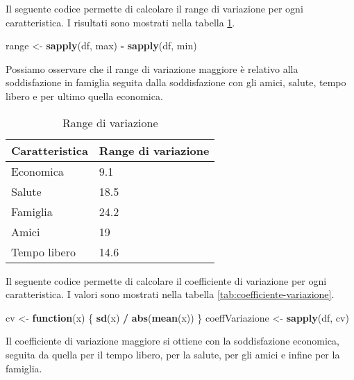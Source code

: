 \documentclass[]{book}
\newenvironment{Shaded}{\begin{snugshade}}{\end{snugshade}}
\newcommand{\KeywordTok}[1]{\textcolor[rgb]{0.13,0.29,0.53}{\textbf{#1}}}
\newcommand{\StringTok}[1]{\textcolor[rgb]{0.31,0.60,0.02}{#1}}
\newcommand{\ControlFlowTok}[1]{\textcolor[rgb]{0.13,0.29,0.53}{\textbf{#1}}}
\newcommand{\OperatorTok}[1]{\textcolor[rgb]{0.81,0.36,0.00}{\textbf{#1}}}
\newcommand{\NormalTok}[1]{#1}
\begin{document}
Il seguente codice permette di calcolare il range di variazione per ogni
caratteristica. I risultati sono mostrati nella tabella
\ref{tab:range-variazione}.

\begin{Shaded}
\begin{Highlighting}[]
\NormalTok{range <-}\StringTok{ }\KeywordTok{sapply}\NormalTok{(df, max) }\OperatorTok{-}\StringTok{ }\KeywordTok{sapply}\NormalTok{(df, min)}
\end{Highlighting}
\end{Shaded}

Possiamo osservare che il range di variazione maggiore è relativo alla
soddisfazione in famiglia seguita dalla soddisfazione con gli amici,
salute, tempo libero e per ultimo quella economica.

\begin{table}

\caption{\label{tab:range-variazione}Range di variazione}
\centering
\begin{tabular}[t]{l|l}
\hline
Caratteristica & Range di variazione\\
\hline
Economica & 9.1\\
\hline
Salute & 18.5\\
\hline
Famiglia & 24.2\\
\hline
Amici & 19\\
\hline
Tempo libero & 14.6\\
\hline
\end{tabular}
\end{table}

Il seguente codice permette di calcolare il coefficiente di variazione
per ogni caratteristica. I valori sono mostrati nella tabella
\ref{tab:coefficiente-variazione}.

\begin{Shaded}
\begin{Highlighting}[]
\NormalTok{cv <-}\StringTok{ }\ControlFlowTok{function}\NormalTok{(x) \{}
  \KeywordTok{sd}\NormalTok{(x) }\OperatorTok{/}\StringTok{ }\KeywordTok{abs}\NormalTok{(}\KeywordTok{mean}\NormalTok{(x))}
\NormalTok{\}}
\NormalTok{coeffVariazione <-}\StringTok{ }\KeywordTok{sapply}\NormalTok{(df, cv)}
\end{Highlighting}
\end{Shaded}

Il coefficiente di variazione maggiore si ottiene con la soddisfazione
economica, seguita da quella per il tempo libero, per la salute, per gli
amici e infine per la famiglia.
\end{document}
